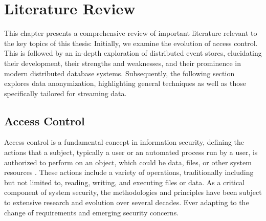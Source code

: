 \chapter{Literature Review\label{cha:chapter2}}
This chapter presents a comprehensive review of important literature relevant to the key topics of this thesis: Initially, we examine the evolution of access control. This is followed by an in-depth exploration of distributed event stores, elucidating their development, their strengths and weaknesses, and their prominence in modern distributed database systems. Subsequently, the following section explores data anonymization, highlighting general techniques as well as those specifically tailored for streaming data.


\section{Access Control\label{sec:rbac}}
Access control is a fundamental concept in information security, defining the actions that a subject, typically a user or an automated process run by a user, is authorized to perform on an object, which could be data, files, or other system resources \cite{Sandhu1994}. These actions include a variety of operations, traditionally including but not limited to, reading, writing, and executing files or data. As a critical component of system security, the methodologies and principles have been subject to extensive research and evolution over several decades. Ever adapting to the change of requirements and emerging security concerns.\par

